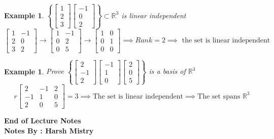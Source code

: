 \documentclass{article}
\newtheorem{ex}[theorem]{Example}
\begin{document}
\begin{ex}
\( \left\{ \begin{bmatrix} 1 \\ 2 \\ 3 \end{bmatrix} \begin{bmatrix} -1 \\ 0 \\ 2 \end{bmatrix} \right\} \subset \mathbb{R}^3 \) is linear independent \\
\[ \begin{bmatrix} 1 & -1 \\ 2 & 0 \\ 3 & 2 \end{bmatrix} \rightarrow \begin{bmatrix} 1 & -1 \\ 0  & 2 \\ 0 & 5 \end{bmatrix} \rightarrow \begin{bmatrix} 1 & 0 \\ 0 & 1 \\ 0 & 0 \end{bmatrix} \implies Rank = 2  \implies \text{ the set is linear independent} \]
\end{ex}

\begin{ex}
Prove \( \left\{ \begin{bmatrix} 2 \\ -1 \\ 2 \end{bmatrix} \begin{bmatrix} -1 \\ 1 \\ 0 \end{bmatrix} \begin{bmatrix} 2 \\ 0 \\ 5 \end{bmatrix} \right\}  \) is a basis of \( \mathbb{R}^3 \) \\
\[ r\begin{bmatrix} 2 & -1 & 2 \\ -1 & 1 & 0 \\ 2 & 0 & 5 \end{bmatrix} = 3 \implies \text{The set is linear independent} \implies \text{The set spans }\mathbb{R}^3\]
\end{ex}



\begin{center}
\textbf{End of Lecture Notes} \\
\textbf{Notes By : Harsh Mistry}
\end{center}
\end{document}
